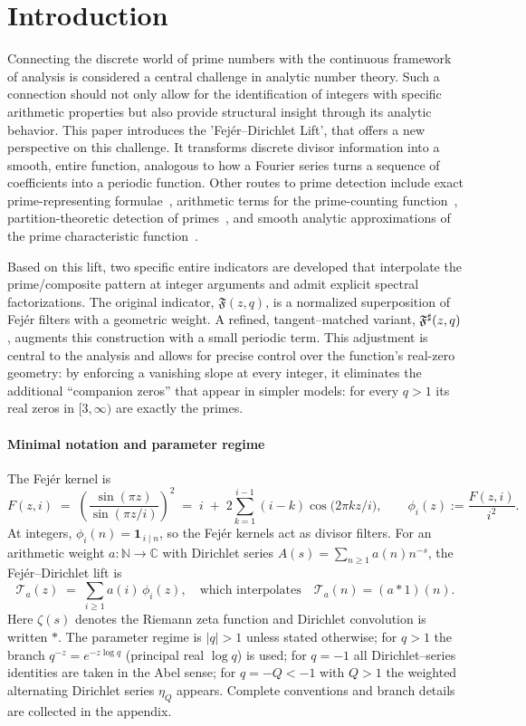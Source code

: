 \section{Introduction}

Connecting the discrete world of prime numbers with the continuous framework of analysis is considered a central challenge in analytic number theory. Such a connection should not only allow for the identification of integers with specific arithmetic properties but also provide structural insight through its analytic behavior. This paper introduces the 'Fej\'er–Dirichlet Lift', that offers a new perspective on this challenge. It transforms discrete divisor information into a smooth, entire function, analogous to how a Fourier series turns a sequence of coefficients into a periodic function. Other routes to prime detection include exact prime-representing formulae~\cite{mills1947,willans1964,hardy2008}, arithmetic terms for the prime-counting function~\cite{prunescu2024}, partition-theoretic detection of primes~\cite{craig2024}, and smooth analytic approximations of the prime characteristic function~\cite{semenov2025}.

Based on this lift, two specific entire indicators are developed that interpolate the prime/composite pattern at integer arguments and admit explicit spectral factorizations. The original indicator, $\mathfrak F(z,q)$, is a normalized superposition of Fej\'er filters with a geometric weight. A refined, tangent–matched variant, $\mathfrak F^{\sharp}(z,q)$, augments this construction with a small periodic term. This adjustment is central to the analysis and allows for precise control over the function's real-zero geometry: by enforcing a vanishing slope at every integer, it eliminates the additional ``companion zeros'' that appear in simpler models: for every $q>1$ its real zeros in $[3,\infty)$ are exactly the primes.

\paragraph{Minimal notation and parameter regime}
The Fej\'er kernel is
\[
F(z,i)\;=\;\left(\frac{\sin(\pi z)}{\sin(\pi z/i)}\right)^{\!2}
\;=\;i\;+\;2\sum_{k=1}^{i-1}(i-k)\cos\!\bigl(2\pi k z/i\bigr),
\qquad
\phi_i(z):=\frac{F(z,i)}{i^{2}}.
\]
At integers, $\phi_i(n)=\mathbf 1_{\,i\mid n}$, so the Fej\'er kernels act as divisor filters.
For an arithmetic weight $a:\mathbb N\to\mathbb C$ with Dirichlet series $A(s)=\sum_{n\ge1} a(n)n^{-s}$, the Fej\'er–Dirichlet lift is
\[
\mathcal T_a(z)\;=\;\sum_{i\ge1} a(i)\,\phi_i(z),
\quad\text{which interpolates}\quad
\mathcal T_a(n)=(a*1)(n).
\]
Here $\zeta(s)$ denotes the Riemann zeta function and Dirichlet convolution is written $*$.
The parameter regime is $|q|>1$ unless stated otherwise; for $q>1$ the branch $q^{-z}=e^{-z\log q}$ (principal real $\log q$) is used; for $q=-1$ all Dirichlet–series identities are taken in the Abel sense; for $q=-Q<-1$ with $Q>1$ the weighted alternating Dirichlet series $\eta_Q$ appears.
Complete conventions and branch details are collected in the appendix.

